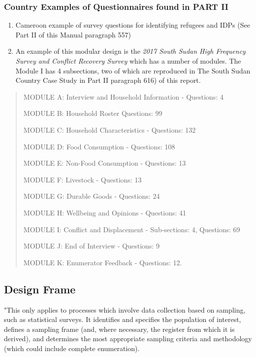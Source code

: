 \documentclass[
]{article}
\begin{document}
\hypertarget{b.3.-country-examples-of-questionnaires-found-in-part-ii}{%
\subsubsection{Country Examples of Questionnaires found in PART II}\label{b.3.-country-examples-of-questionnaires-found-in-part-ii}}

\begin{enumerate}
\def\labelenumi{\arabic{enumi}.}
\setcounter{enumi}{128}
\item
  Cameroon example of survey questions for identifying refugees and
  IDPs (See Part II of this Manual paragraph 557)
\item
  An example of this modular design is the \emph{2017 South Sudan High
  Frequency Survey and Conflict Recovery Survey} which has a number of
  modules. The Module I has 4 subsections, two of which are reproduced
  in The South Sudan Country Case Study in Part II paragraph 616) of
  this report.
\end{enumerate}

\begin{quote}
MODULE A: Interview and Household Information - Questions: 4

MODULE B: Household Roster Questions: 99

MODULE C: Household Characteristics - Questions: 132

MODULE D: Food Consumption - Questions: 108

MODULE E: Non-Food Consumption - Questions: 13

MODULE F: Livestock - Questions: 13

MODULE G: Durable Goods - Questions: 24

MODULE H: Wellbeing and Opinions - Questions: 41

MODULE I: Conflict and Displacement - Sub-sections: 4, Questions: 69

MODULE J: End of Interview - Questions: 9

MODULE K: Enumerator Feedback - Questions: 12.
\end{quote}

\hypertarget{design-frame-1}{%
\subsection{Design Frame}\label{design-frame-1}}

"This only applies to processes which involve data collection based on
sampling, such as statistical surveys. It identifies and specifies the
population of interest, defines a sampling frame (and, where necessary,
the register from which it is derived), and determines the most
appropriate sampling criteria and methodology (which could include
complete enumeration).
\end{document}
